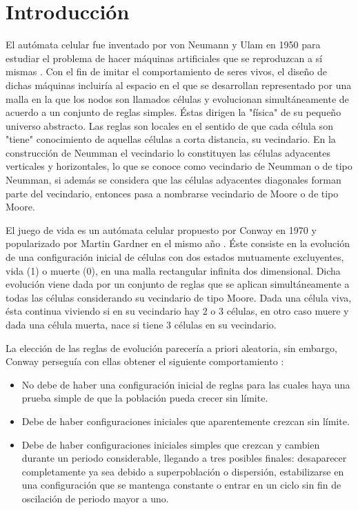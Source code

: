 \documentclass[../proyecto.tex]{book}
\begin{document}
\chapter{Introducción}

El autómata celular fue inventado por von Neumann y Ulam en 1950 para estudiar el problema de hacer máquinas artificiales que se reproduzcan a sí mismas \cite{neummanUlam}. Con el fin de imitar el comportamiento de seres vivos, el diseño de dichas máquinas incluiría al espacio en el que se desarrollan representado por una malla en la que los nodos son llamados células y evolucionan simultáneamente de acuerdo a un conjunto de reglas simples. Éstas dirigen la "física" de su pequeño universo abstracto. Las reglas son locales en el sentido de que cada célula son "tiene" conocimiento de aquellas células a corta distancia, su vecindario. En la construcción de Neumman el vecindario lo constituyen las células adyacentes verticales y horizontales, lo que se conoce como vecindario de Neumman o de tipo Neumman, si además se considera que las células adyacentes diagonales forman parte del vecindario, entonces pasa a nombrarse vecindario de Moore o de tipo Moore.

El juego de vida es un autómata celular propuesto por Conway en 1970 y popularizado por Martin Gardner en el mismo año \cite{primerap}. Éste consiste en la evolución de una configuración inicial de células con dos estados mutuamente excluyentes, vida (1) o muerte (0), en una malla rectangular infinita dos dimensional. Dicha evolución viene dada por un conjunto de reglas que se aplican simultáneamente a todas las células considerando su vecindario de tipo Moore. Dada una célula viva, ésta continua viviendo si en su vecindario hay 2 o 3 células, en otro caso muere y dada una célula muerta, nace si tiene 3 células en su vecindario.

La elección de las reglas de evolución parecería a priori aleatoria, sin embargo, Conway perseguía con ellas obtener el siguiente comportamiento \cite{libroGardner}:
\begin{itemize}
	\item No debe de haber una configuración inicial de reglas para las cuales haya una prueba simple de que la población pueda crecer sin límite.
	\item Debe de haber configuraciones iniciales que aparentemente crezcan sin límite. 
	\item Debe de haber configuraciones iniciales simples que crezcan y cambien durante un periodo considerable, llegando a tres posibles finales: desaparecer completamente ya sea debido a superpoblación o dispersión, estabilizarse en una configuración que se mantenga constante o entrar en un ciclo sin fin de oscilación de periodo mayor a uno.  
\end{itemize}
\end{document}
